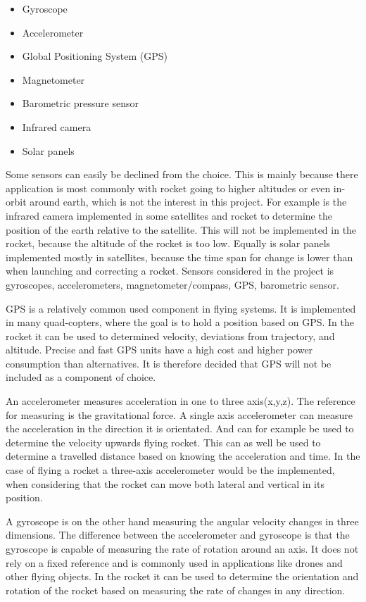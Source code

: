 \begin{itemize}[noitemsep]
\item Gyroscope
\item Accelerometer
\item Global Positioning System (GPS)
\item Magnetometer
\item Barometric pressure sensor
\item Infrared camera
\item Solar panels
\end{itemize}

Some sensors can easily be declined from the choice. This is mainly because there application is most commonly with rocket going to higher altitudes or even in-orbit around earth, which is not the interest in this project. For example is the infrared camera implemented in some satellites and rocket to determine the position of the earth relative to the satellite. This will not be implemented in the rocket, because the altitude of the rocket is too low. Equally is solar panels implemented mostly in satellites, because the time span for change is lower than when launching and correcting a rocket.
Sensors considered in the project is gyroscopes, accelerometers, magnetometer/compass, GPS, barometric sensor. 

GPS is a relatively common used component in flying systems. It is implemented in many quad-copters, where the goal is to hold a position based on GPS. In the rocket it can be used to determined velocity, deviations from trajectory, and altitude. Precise and fast GPS units have a high cost and higher power consumption than alternatives. It is therefore decided that GPS will not be included as a component of choice.    

An accelerometer measures acceleration in one to three axis(x,y,z). The reference for measuring is the gravitational force. A single axis accelerometer can measure the acceleration in the direction it is orientated. And can for example be used to determine the velocity upwards flying rocket. This can as well be used to determine a travelled distance based on knowing the acceleration and time. In the case of flying a rocket a three-axis accelerometer would be the implemented, when considering that the rocket can move both lateral and vertical in its position.  


A gyroscope is on the other hand measuring the angular velocity changes in three dimensions. The difference between the accelerometer and gyroscope is that the gyroscope is capable of measuring the rate of rotation around an axis. It does not rely on a fixed reference and is commonly used in applications like drones and other flying objects. In the rocket it can be used to determine the orientation and rotation of the rocket based on measuring the rate of changes in any direction.  


